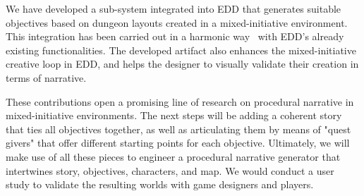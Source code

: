 We have developed a sub-system integrated into EDD that generates suitable objectives based on dungeon layouts created in a mixed-initiative environment. This integration has been carried out in a harmonic way~ with EDD's already existing functionalities.
The developed artifact also 
enhances the mixed-initiative creative loop in EDD, and helps the designer to visually validate their creation in terms of narrative. 

These contributions open a promising line of research on procedural narrative in mixed-initiative environments. The next steps will be adding a coherent story that ties all objectives together, as well as articulating them by means of "quest givers"
that offer different starting points for each objective. Ultimately, we will make use of all these pieces to engineer a procedural narrative generator that intertwines story, objectives, characters, and map. We would conduct a user study to validate the resulting worlds with game designers and players. 

